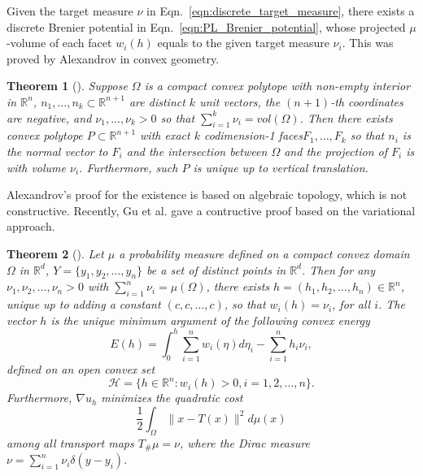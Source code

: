 \documentclass{article}
\newtheorem{theorem}{Theorem}[section]
\begin{document}
Given the target measure $\nu$ in Eqn.~\ref{eqn:discrete_target_measure}, there exists a discrete Brenier potential in Eqn.~\ref{eqn:PL_Brenier_potential}, whose projected $\mu$-volume of each facet $w_i(h)$ equals to the given target measure $\nu_i$. This was proved by Alexandrov in convex geometry.

\begin{theorem} [\cite{alex}]
Suppose $\Omega$ is a compact convex polytope with non-empty
interior in $\mathbb{R}^n$, $n_1, ..., n_k \subset \mathbb{R}^{n+1}$ are
distinct $k$ unit vectors, the $(n+1)$-th coordinates are negative, and $\nu_1, ..., \nu_k >0$ so that $\sum_{i=1}^k \nu_i=vol(\Omega)$. Then there exists convex polytope $P\subset \mathbb{R}^{n+1}$ with exact $k$ codimension-1 faces$F_1,\dots,F_k$ so that $n_i$ is the normal vector to $F_i$ and the intersection between $\Omega$ and the projection of $F_i$ is with volume $\nu_i$. Furthermore, such $P$ is unique up to vertical translation.
\end{theorem}


Alexandrov's proof for the existence is based on algebraic topology, which is not constructive. Recently, Gu et al. gave a contructive proof based on the variational approach.
 \begin{theorem}[\cite{gu2013theory}]
 \label{thm:gu_yau}
 Let $\mu$ a probability measure defined on a compact convex domain $\Omega$ in $\mathbb{R}^d$, $Y=\{y_1, y_2, \ldots, y_n\}$ be a set of distinct points in $\mathbb{R}^d$. Then for any $\nu_1, \nu_2, \ldots, \nu_n > 0$ with $\sum_{i=1}^n \nu_i = \mu(\Omega)$, there exists $h = (h_1, h_2, \ldots, h_n) \in \mathbb{R}^n$, unique up to adding a constant $(c,c, \ldots, c)$, so that $w_i(h)  = \nu_i$, for all $i$. The vector $h$ is the unique minimum argument of the following convex energy
 \begin{equation}
    \label{eqn:alexandrov_potential}
     E(h) = \int_0^h \sum_{i=1}^n w_i(\eta)d\eta_i - \sum_{i=1}^n h_i\nu_i,
 \end{equation}
 defined on an open convex set
 \begin{equation}
     \mathcal{H} = \{h\in \mathbb{R}^n : w_i(h)>0, i=1,2,\ldots, n\}.
     \label{eqn:space}
 \end{equation}
 Furthermore, $\nabla u_h$ minimizes the quadratic cost
 \begin{equation}
 \frac{1}{2}\int_{\Omega} \|x - T(x)\|^2d\mu(x)
 \end{equation}
 among all transport maps $T_{\#}\mu=\nu$, where the Dirac measure $\nu = \sum_{i=1}^n \nu_i\delta(y-y_i)$.
 \end{theorem}
\end{document}
